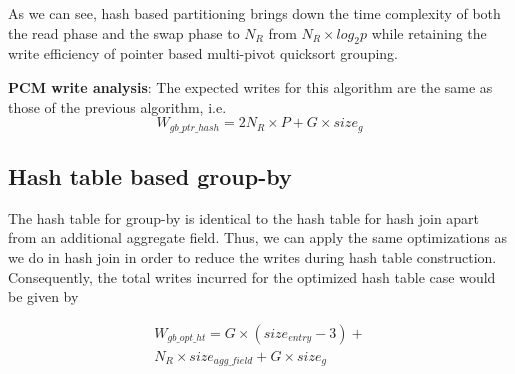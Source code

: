 As we can see, hash based partitioning brings down the time complexity of both the read phase and the swap phase to $N_R$ from $N_R \times log_2p$ while retaining the write efficiency of pointer based multi-pivot quicksort grouping. 


\textbf{PCM write analysis}: The expected writes for this algorithm are the same as those of the previous algorithm, i.e. 
\begin{equation}
\label{eq:gby_ptr_hash}
W_{gb\_ptr\_hash} = 2N_R \times P + G \times size_g
\end{equation}

\subsection{Hash table based group-by}
The hash table for group-by is identical to the hash table for hash join apart from an additional aggregate field. Thus, we can apply the same optimizations as we do in hash join in order to reduce the writes during hash table construction. Consequently, the total writes incurred for the optimized hash table case would be given by

\begin{equation}
\begin{split}
W_{gb\_opt\_ht} = G \times (size_{entry} - 3) + \\
N_R \times size_{agg\_field} + G \times size_g
\end{split}
\end{equation}


